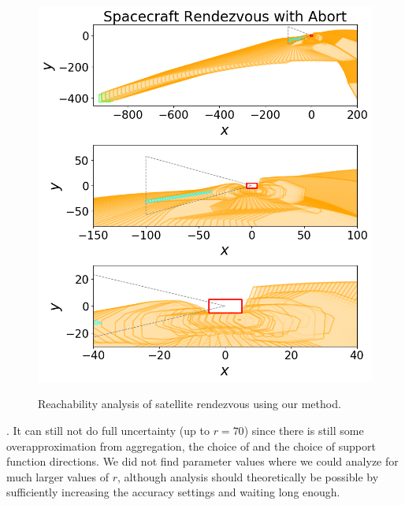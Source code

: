\begin{figure}
\begin{minipage}{0.48\textwidth}
\begin{minipage}[b]{\linewidth}
\label{fig:deagg}
\end{minipage}
\\
\vspace{0.5em}
\begin{minipage}[b]{\linewidth}
\centerline{\includegraphics[width=\columnwidth]{images/rendezvous.png}}
\label{fig:rendezvous}
\end{minipage}
\caption{Reachability analysis of satellite rendezvous using our method.}
\end{minipage}
\end{figure}

.
%
It can still not do full uncertainty (up to $r=70$) since there is still some overapproximation from aggregation, the choice of  and the
choice of support function directions.
%
We did not find parameter values where we could analyze for much larger values of $r$,
although analysis should theoretically be possible by sufficiently increasing the accuracy settings and waiting long enough.

